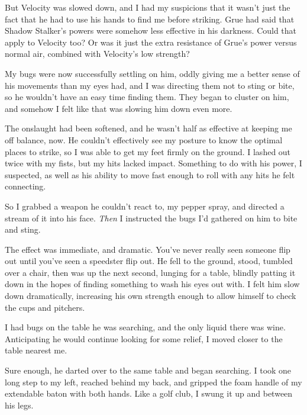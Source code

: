 But Velocity was slowed down, and I had my suspicions that it wasn't just the fact that he had to use his hands to find me before striking.  Grue had said that Shadow Stalker's powers were somehow less effective in his darkness.  Could that apply to Velocity too?  Or was it just the extra resistance of Grue's power versus normal air, combined with Velocity's low strength?



My bugs were now successfully settling on him, oddly giving me a better sense of his movements than my eyes had, and I was directing them not to sting or bite, so he wouldn't have an easy time finding them.  They began to cluster on him, and somehow I felt like that was slowing him down even more.



The onslaught had been softened, and he wasn't half as effective at keeping me off balance, now.  He couldn't effectively see my posture to know the optimal places to strike, so I was able to get my feet firmly on the ground.  I lashed out twice with my fists, but my hits lacked impact.  Something to do with his power, I suspected, as well as his ability to move fast enough to roll with any hits he felt connecting.



So I grabbed a weapon he couldn't react to, my pepper spray, and directed a stream of it into his face.  \emph{Then} I instructed the bugs I'd gathered on him to bite and sting.



The effect was immediate, and dramatic.  You've never really seen someone flip out until you've seen a speedster flip out.  He fell to the ground, stood, tumbled over a chair, then was up the next second, lunging for a table, blindly patting it down in the hopes of finding something to wash his eyes out with.  I felt him slow down dramatically, increasing his own strength enough to allow himself to check the cups and pitchers.



I had bugs on the table he was searching, and the only liquid there was wine.  Anticipating he would continue looking for some relief, I moved closer to the table nearest me.



Sure enough, he darted over to the same table and began searching.  I took one long step to my left, reached behind my back, and gripped the foam handle of my extendable baton with both hands.  Like a golf club, I swung it up and between his legs.




